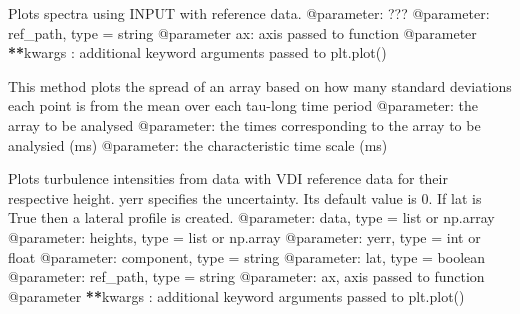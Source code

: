\documentclass[letterpaper,10pt,english]{sphinxmanual}
\begin{document}

\begin{fulllineitems}
\label{\detokenize{index:windtunnel.plot_spectra}}
Plots spectra using INPUT with reference data.
@parameter: ???
@parameter: ref\_path, type = string
@parameter ax: axis passed to function
@parameter {\color{red}\bfseries{}**}kwargs : additional keyword arguments passed to plt.plot()

\end{fulllineitems}


\begin{fulllineitems}
\label{\detokenize{index:windtunnel.plot_stdevs}}
This method plots the spread of an array based on how many standard 
deviations each point is from the mean over each tau-long time period
@parameter: the array to be analysed
@parameter: the times corresponding to the array to be analysied (ms)
@parameter: the characteristic time scale (ms)

\end{fulllineitems}


\begin{fulllineitems}
\label{\detokenize{index:windtunnel.plot_turb_int}}
Plots turbulence intensities from data with VDI reference data for 
their respective height. yerr specifies the uncertainty. Its default value
is 0. If lat is True then a lateral profile is created.
@parameter: data, type = list or np.array
@parameter: heights, type = list or np.array
@parameter: yerr, type = int or float
@parameter: component, type = string
@parameter: lat, type = boolean
@parameter: ref\_path, type = string
@parameter: ax, axis passed to function    
@parameter {\color{red}\bfseries{}**}kwargs : additional keyword arguments passed to plt.plot()

\end{fulllineitems}
\end{document}
